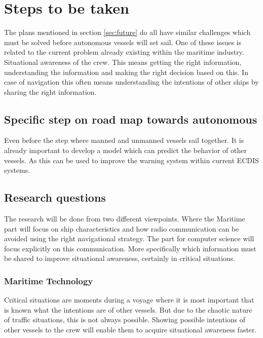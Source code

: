 \chapter{Steps to be taken}
The plans mentioned in section \ref{sec:future} do all have similar challenges which must be solved before autonomous vessels will set sail. One of these issues is related to the current problem already existing within the maritime industry. Situational awareness of the crew. This means getting the right information, understanding the information and making the right decision based on this. In case of navigation this often means understanding the intentions of other ships by sharing the right information.

\section{Specific step on road map towards autonomous}
Even before the step where manned and unmanned vessels sail together. It is already important to develop a model which can predict the behavior of other vessels. As this can be used to improve the warning system within current ECDIS systems. 

\section{Research questions}
The research will be done from two different viewpoints. Where the Maritime part will focus on ship characteristics and how radio communication can be avoided using the right navigational strategy. The part for computer science will focus explicitly on this communication. More specifically which information must be shared to improve situational awareness, certainly in critical situations.

\subsection{Maritime Technology}
Critical situations are moments during a voyage where it is most important that is known what the intentions are of other vessels. But due to the chaotic nature of traffic situations, this is not always possible. Showing possible intentions of other vessels to the crew will enable them to acquire situational awareness faster. 

